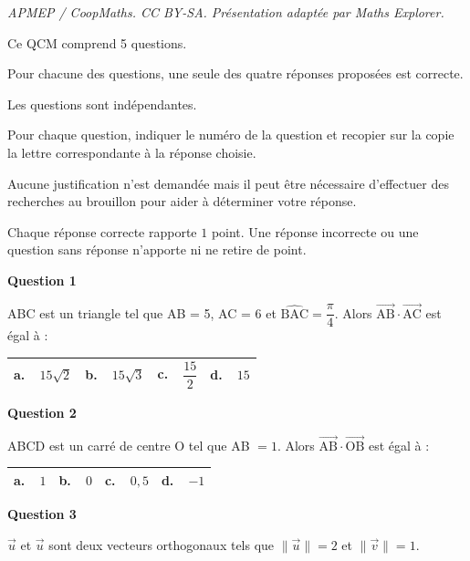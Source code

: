 \documentclass[10pt]{article}
\providecommand{\vect}[1]{\overrightarrow{#1}}
\begin{document}
\noindent\textit{APMEP / CoopMaths. CC BY-SA. Présentation adaptée par Maths Explorer.}\par\medskip
\medskip

Ce QCM comprend 5 questions.

Pour chacune des questions, une seule des quatre réponses proposées est correcte.

Les questions sont indépendantes.

Pour chaque question, indiquer le numéro de la question et recopier sur la copie la lettre correspondante à la réponse choisie.

Aucune justification n'est demandée mais il peut être nécessaire d'effectuer des recherches au brouillon pour aider à déterminer votre réponse.

Chaque réponse correcte rapporte $1$ point. Une réponse incorrecte ou une question sans réponse n'apporte ni ne retire de point.

\medskip

\textbf{Question 1}

ABC est un triangle tel que AB = 5, AC = 6 et $\widehat{\text{BAC}}= \dfrac{\pi}{4}$. Alors $\vect{\text{AB}} \cdot \vect{\text{AC}}$ est égal à :

\begin{center}
\begin{tabularx}{\linewidth}{|*{4}{X|}}\hline
\textbf{a.~~}$15\sqrt{2}$&\textbf{b.~~}$15\sqrt{3}$&\textbf{c.~~}$\dfrac{15}{2}$\rule[-3mm]{0mm}{9mm}&\textbf{d.~~}$15$\\ \hline
\end{tabularx}
\end{center}

\medskip

\textbf{Question 2}

ABCD est un carré de centre O tel que AB $=1$. Alors $\vect{\text{AB}} \cdot \vect{\text{OB}}$ est égal à :

\begin{center}
\begin{tabularx}{\linewidth}{|*{4}{X|}}\hline
\textbf{a.~~}$1$&\textbf{b.~~}$0$&\textbf{c.~~}$0,5$&\textbf{d.~~}$- 1$\\ \hline
\end{tabularx}
\end{center}

\textbf{Question 3} 

$\vect{u}$ et $\vect{u}$ sont deux vecteurs orthogonaux tels que $\|\vect{u}\| = 2$ et $\|\vect{v}\| = 1$. 
\end{document}
